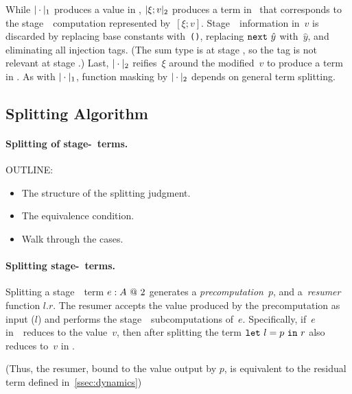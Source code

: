 While $|\cdot|_{ 1}$ produces a value in \langmono, $|\xi;v|_{ 2}$
produces a term in \langmono\ that corresponds to the stage~\bbtwo\
computation represented by~$[\xi;v]$.  Stage~\bbone\ information
in~$v$ is discarded by replacing base constants with~\texttt{()},
replacing ${\tt next}~\hat{y}$ with~$\hat{y}$, and eliminating all
injection tags. (The sum type is at stage \bbone, so the tag is not
relevant at stage \bbtwo.)  Last, $|\cdot|_{ 2}$ reifies~$\xi$ around
the modified~$v$ to produce a term in \langmono.  As with
$|\cdot|_{ 1}$, function masking by $|\cdot|_{ 2}$ depends on
general term splitting.


\subsection{Splitting Algorithm}


\paragraph{Splitting of stage-\bbone\ terms.}


OUTLINE:

\begin{itemize}
\item 
The structure of the splitting judgment.

\item
The equivalence condition.

\item
Walk through the cases.
\end{itemize}


\paragraph{Splitting stage-\bbtwo\ terms.}

Splitting a stage~\bbtwo\ term ${e}:{A}~@~ 2$ generates a
\emph{precomputation}~$p$, and a~\emph{resumer} function $l.r$.  The
resumer accepts the value produced by the precomputation as input
($l$) and performs the stage~\bbtwo\ subcomputations of~$e$.
Specifically, if~$e$ in~\lang\ reduces to the value~$v$, then after
splitting the term ${\tt let}~{l} = {p}~{\tt in}~{r}$ also reduces to~$v$ in \langmono.

(Thus, the resumer, bound to the value output by $p$, is equivalent to
the residual term defined in~\ref{ssec:dynamics})




